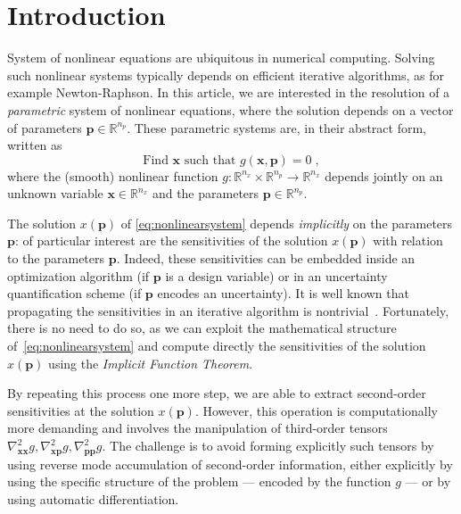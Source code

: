 \section{Introduction}
System of nonlinear equations are ubiquitous in numerical computing.
Solving such nonlinear systems typically depends on efficient iterative
algorithms, as for example Newton-Raphson. In this article, we are interested in the
resolution of a \emph{parametric} system of nonlinear equations, where
the solution depends on a vector of parameters $\bm{p} \in \mathbb{R}^{n_p}$.
These parametric systems are, in their abstract form, written as
\begin{equation}
  \label{eq:nonlinearsystem}
  \text{Find } \bm{x} \text{ such that } g(\bm{x}, \bm{p}) = 0  \; ,
\end{equation}
where the (smooth) nonlinear function $g: \mathbb{R}^{n_x} \times \mathbb{R}^{n_p} \to \mathbb{R}^{n_x}$
depends jointly on an unknown variable $\bm{x} \in \mathbb{R}^{n_x}$ and the parameters $\bm{p} \in \mathbb{R}^{n_p}$.

The solution $x(\bm{p})$ of \eqref{eq:nonlinearsystem} depends \emph{implicitly} on the parameters $\bm{p}$:
of particular interest are the sensitivities of the solution $x(\bm{p})$ with relation to the parameters $\bm{p}$.
Indeed, these sensitivities can be embedded inside an optimization algorithm (if $\bm{p}$ is a design variable)
or in an uncertainty quantification scheme (if $\bm{p}$ encodes an uncertainty).
It is well known that propagating the sensitivities in an iterative algorithm is nontrivial~\cite{gilbert1992automatic}.
Fortunately, there is no need to do so, as we can exploit the mathematical structure of~\eqref{eq:nonlinearsystem}
and compute directly the sensitivities of the solution~$x(\bm{p})$ using the \emph{Implicit Function
Theorem}.

By repeating this process one more step, we are able to extract second-order
sensitivities at the solution $x(\bm{p})$. However, this operation is computationally more demanding
and involves the manipulation of third-order tensors $\nabla^2_{\bm{x}\bm{x}} g, \nabla^2_{\bm{x}\bm{p}} g, \nabla^2_{\bm{p}\bm{p}} g$.
The challenge is to avoid forming explicitly such tensors by using reverse mode accumulation of second-order
information, either explicitly by using the specific structure of the problem
--- encoded by the function $g$ --- or by using automatic differentiation.

